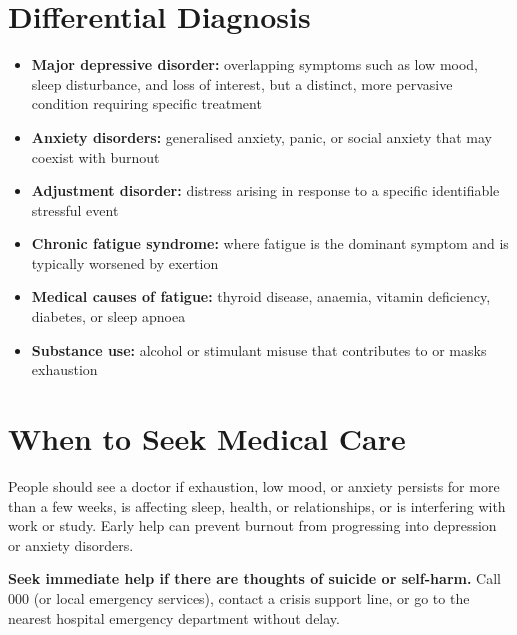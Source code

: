 \section*{Differential Diagnosis}
\begin{itemize}
    \item \textbf{Major depressive disorder:} overlapping symptoms such as low mood, sleep disturbance, and loss of interest, but a distinct, more pervasive condition requiring specific treatment
    \item \textbf{Anxiety disorders:} generalised anxiety, panic, or social anxiety that may coexist with burnout
    \item \textbf{Adjustment disorder:} distress arising in response to a specific identifiable stressful event
    \item \textbf{Chronic fatigue syndrome:} where fatigue is the dominant symptom and is typically worsened by exertion
    \item \textbf{Medical causes of fatigue:} thyroid disease, anaemia, vitamin deficiency, diabetes, or sleep apnoea
    \item \textbf{Substance use:} alcohol or stimulant misuse that contributes to or masks exhaustion
\end{itemize}

\section*{When to Seek Medical Care}
People should see a doctor if exhaustion, low mood, or anxiety persists for more than a few weeks, is affecting sleep, health, or relationships, or is interfering with work or study. Early help can prevent burnout from progressing into depression or anxiety disorders.

\textbf{Seek immediate help if there are thoughts of suicide or self-harm.} Call 000 (or local emergency services), contact a crisis support line, or go to the nearest hospital emergency department without delay.

